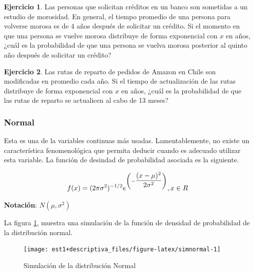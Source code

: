 \documentclass[
  11pt,
]{book}
\theoremstyle{definition}
\theoremstyle{definition}
\theoremstyle{definition}
\newtheorem{exercise}{Ejercicio}[chapter]
\theoremstyle{definition}
\theoremstyle{remark}
\begin{document}
\begin{exercise}
Las personas que solicitan créditos en un banco son sometidas a un estudio de morosidad. En general, el tiempo promedio de una persona para volverse morosa es de 4 años después de solicitar un crédito. Si el momento en que una persona se vuelve morosa distribuye de forma exponencial con \(x\) en años, ¿cuál es la probabilidad de que una persona se vuelva morosa posterior al quinto año después de solicitar un crédito?
\end{exercise}

\begin{exercise}
Las rutas de reparto de pedidos de Amazon en Chile son modificadas en promedio cada año. Si el tiempo de actualización de las rutas distribuye de forma exponencial con \(x\) en años, ¿cuál es la probabilidad de que las rutas de reparto se actualicen al cabo de 13 meses?
\end{exercise}

\subsubsection{Normal}\label{normal}

Esta es una de la variables continuas más usadas. Lamentablemente, no existe un característica fenomenológica que permita deducir cuando es adecuado utilizar esta variable. La función de desindad de probabilidad asociada es la siguiente.

\begin{equation}
\notag
f(x)= (2\pi \sigma^2)^{-1/2}e^{\left( -\displaystyle\frac{(x-\mu)^2}{2\sigma^2} \right)} ,x \in R
\end{equation}

\textbf{Notación}: \(N(\mu, \sigma^2)\)

La figura \ref{fig:simnormal}, muestra una simulación de la función de densidad de probabilidad de la distribución normal.

\begin{figure}

{\centering \texttt{[image: est1+descriptiva\_files/figure-latex/simnormal-1]} 

}

\caption{Simulación de la distribución Normal}\label{fig:simnormal}
\end{figure}
\end{document}
